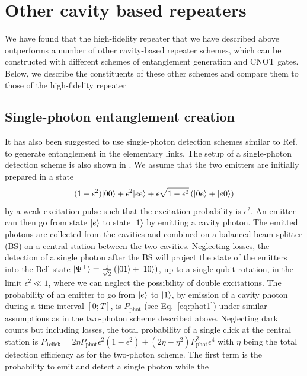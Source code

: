 \section{Other cavity based repeaters} \label{sec:other} 

We have found that the high-fidelity repeater that we have described above
outperforms a number of other cavity-based repeater schemes, which can be
constructed with different schemes of entanglement generation and CNOT gates.
Below, we describe the constituents of these other schemes and compare them to
those of the high-fidelity repeater

\subsection{Single-photon entanglement creation} \label{sec:1phot}
It has also been suggested to use single-photon detection schemes similar to
Ref.~\cite{huelga} to generate entanglement in the elementary links. The setup
of a single-photon detection scheme is also shown in . We
assume that the two emitters are initially prepared in a state
\begin{equation}
(1-\epsilon^{2})| 00 \rangle+\epsilon^{2}
| ee \rangle+\epsilon\sqrt{1-\epsilon^{2}}\left(| 0e \rangle+| e0 \rangle\right)
\end{equation}    
by a weak excitation pulse such that the excitation probability is
$\epsilon^{2}$. An emitter can then go from state $| e \rangle$ to state $| 1 \rangle$
by emitting a cavity photon. The emitted photons are collected from the cavities
and combined on a balanced beam splitter (BS) on a central station between the
two cavities. Neglecting losses, the detection of a single photon after the BS
will project the state of the emitters into the Bell state
$| \Psi^{+} \rangle=\frac{1}{\sqrt{2}}\left(| 01 \rangle+| 10 \rangle\right)$, up to a
single qubit rotation, in the limit $\epsilon^{2}\ll1$, where we can neglect the
possibility of double excitations. The probability of an emitter to go from
$| e \rangle$ to $| 1 \rangle$, by emission of a cavity photon during a time interval
$[0;T]$, is $P_{\mathrm{phot}}$ (see Eq.~\eqref{eq:phot1}) under similar
assumptions as in the two-photon scheme described above. Neglecting dark counts
but including losses, the total probability of a single click at the central
station is $P_{\mathrm{1click}}=2\eta
P_{\mathrm{phot}}\epsilon^{2}(1-\epsilon^{2})+(2\eta-\eta^{2})P_{\mathrm{phot}}^{2}\epsilon^{4}$
with $\eta$ being the total detection efficiency as for the two-photon scheme.
The first term is the probability to emit and detect a single photon while the
